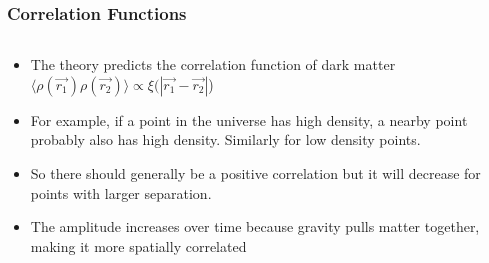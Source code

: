 \documentclass{beamer}
\begin{document}
\frame
{

    \frametitle{Correlation Functions}


    \begin{columns}
        \begin{column}{0.5\textwidth}
            \begin{itemize}

                \item The theory predicts the correlation function of
                    dark matter 
                    {\color{gold} $\langle \rho(\vec{r_1}) \rho(\vec{r_2})
                    \rangle \propto \xi(|\vec{r_1} - \vec{r_2}|$) }

                \item For example, if a point in the universe has high density, a nearby
                    point probably also has high density. Similarly
                    for low density points.
                    
                \item So there should generally
                    be a positive correlation but it will decrease
                    for  points with larger separation.
                    
                \item The amplitude increases over time because gravity pulls
                    matter together, making it more spatially correlated


            \end{itemize}


\end{column}
\end{columns}}
\end{document}
